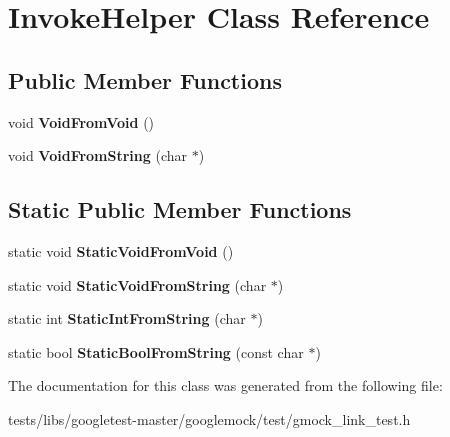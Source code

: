 \hypertarget{classInvokeHelper}{}\section{Invoke\+Helper Class Reference}
\label{classInvokeHelper}
\subsection*{Public Member Functions}
\begin{DoxyCompactItemize}
\item 
\mbox{\label{classInvokeHelper_a6371bcb64a8f01093f6fdef60776a031}} 
void {\bfseries Void\+From\+Void} ()
\item 
\mbox{\label{classInvokeHelper_a89f02dc384e6b5a7d935b7ea0a81cc9e}} 
void {\bfseries Void\+From\+String} (char $\ast$)
\end{DoxyCompactItemize}
\subsection*{Static Public Member Functions}
\begin{DoxyCompactItemize}
\item 
\mbox{\label{classInvokeHelper_ae96b5bd7c4fa328d0a87bc986f135fe8}} 
static void {\bfseries Static\+Void\+From\+Void} ()
\item 
\mbox{\label{classInvokeHelper_a5e95ce4214e89b180da9953d94396536}} 
static void {\bfseries Static\+Void\+From\+String} (char $\ast$)
\item 
\mbox{\label{classInvokeHelper_a5cfb11cca70ec5a9f59e8b7a4d4c2f85}} 
static int {\bfseries Static\+Int\+From\+String} (char $\ast$)
\item 
\mbox{\label{classInvokeHelper_aef16e38107cd8ddc0a52d7d0ab153211}} 
static bool {\bfseries Static\+Bool\+From\+String} (const char $\ast$)
\end{DoxyCompactItemize}


The documentation for this class was generated from the following file\+:\begin{DoxyCompactItemize}
\item 
tests/libs/googletest-\/master/googlemock/test/gmock\+\_\+link\+\_\+test.\+h\end{DoxyCompactItemize}
